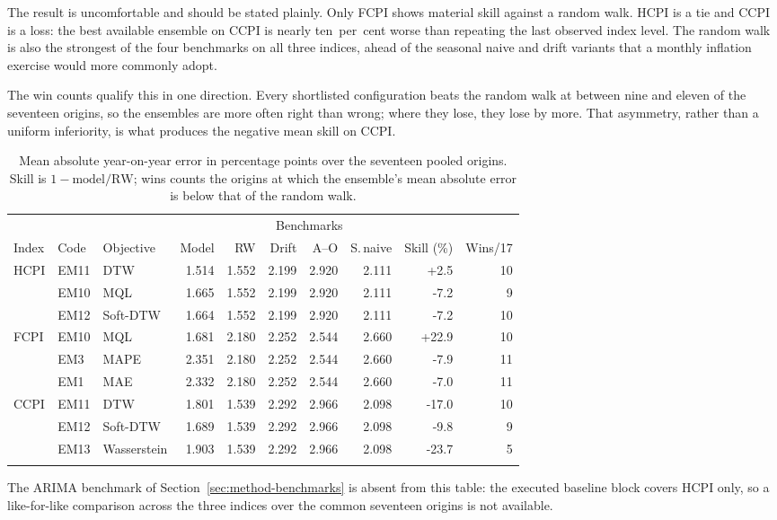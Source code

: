 \documentclass[12pt]{article}
\begin{document}
The result is uncomfortable and should be stated plainly. Only FCPI shows
material skill against a random walk. HCPI is a tie and CCPI is a loss: the
best available ensemble on CCPI is nearly ten~per~cent worse than repeating the
last observed index level. The random walk is also the strongest of the four
benchmarks on all three indices, ahead of the seasonal naive and drift variants
that a monthly inflation exercise would more commonly adopt.

The win counts qualify this in one direction. Every shortlisted configuration
beats the random walk at between nine and eleven of the seventeen origins, so
the ensembles are more often right than wrong; where they lose, they lose by
more. That asymmetry, rather than a uniform inferiority, is what produces the
negative mean skill on CCPI.

\begin{table}[htbp]\centering
\caption{Mean absolute year-on-year error in percentage points over the seventeen pooled origins. Skill is $1-\text{model}/\text{RW}$; wins counts the origins at which the ensemble's mean absolute error is below that of the random walk.}
\label{tab:bench17}
\begin{threeparttable}\small
\begin{tabular}{@{}l l l r r r r r r r@{}}
\toprule
 & & & & \multicolumn{4}{c}{Benchmarks} & & \\
\cmidrule(lr){5-8}
Index & Code & Objective & Model & RW & Drift & A--O & S.\,naive & Skill (\%) & Wins/17 \\
\midrule
HCPI & EM11 & DTW & 1.514 & 1.552 & 2.199 & 2.920 & 2.111 & +2.5 & 10 \\
 & EM10 & MQL & 1.665 & 1.552 & 2.199 & 2.920 & 2.111 & -7.2 & 9 \\
 & EM12 & Soft-DTW & 1.664 & 1.552 & 2.199 & 2.920 & 2.111 & -7.2 & 10 \\
\addlinespace[2pt]
FCPI & EM10 & MQL & 1.681 & 2.180 & 2.252 & 2.544 & 2.660 & +22.9 & 10 \\
 & EM3 & MAPE & 2.351 & 2.180 & 2.252 & 2.544 & 2.660 & -7.9 & 11 \\
 & EM1 & MAE & 2.332 & 2.180 & 2.252 & 2.544 & 2.660 & -7.0 & 11 \\
\addlinespace[2pt]
CCPI & EM11 & DTW & 1.801 & 1.539 & 2.292 & 2.966 & 2.098 & -17.0 & 10 \\
 & EM12 & Soft-DTW & 1.689 & 1.539 & 2.292 & 2.966 & 2.098 & -9.8 & 9 \\
 & EM13 & Wasserstein & 1.903 & 1.539 & 2.292 & 2.966 & 2.098 & -23.7 & 5 \\
\addlinespace[2pt]
\bottomrule
\end{tabular}
\begin{tablenotes}[flushleft]\footnotesize
\item The ARIMA benchmark of Section~\ref{sec:method-benchmarks} is absent from this table: the executed baseline block covers HCPI only, so a like-for-like comparison across the three indices over the common seventeen origins is not available.
\end{tablenotes}\end{threeparttable}\end{table}
\end{document}
